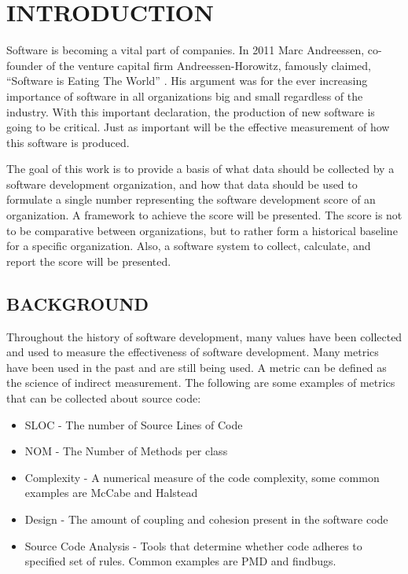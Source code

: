 \documentclass[SDSUThesis.tex]{subfiles}
\begin{document}
\newpage
{}
\setcounter{tocdepth}{2}

\section{INTRODUCTION}

    Software is becoming a vital part of companies. In 2011 Marc Andreessen, 
    co-founder of the venture capital firm Andreessen-Horowitz,
    famously claimed, ``Software is Eating The World'' \cite{Andreessen2001}. 
    His argument was for the ever increasing importance of software
    in all organizations big and small regardless of the industry.  With 
    this important declaration, the production of new software is
    going to be critical.  Just as important will be the effective 
    measurement of how this software is produced.  
    
    The goal of this work is to provide a basis of what data should 
    be collected by a software development organization, and how that data
    should be used to formulate a single number representing the 
    software development score of an organization. A framework to 
    achieve the score will be presented.  The  score
    is not to be comparative between organizations, but to 
    rather form a historical baseline for a specific organization.  Also, a software
    system to collect, calculate, and report the score will be presented.

\subsection{BACKGROUND}

    Throughout the history of software development, many values have been 
    collected and used to measure the effectiveness of software development. 
    Many metrics have been used in the past and are still being used.  
    A metric can be defined as the science of indirect measurement.
    The following are some examples of metrics that can be collected 
    about source code:
    \begin{itemize}
        \item SLOC - The number of Source Lines of Code 
        \item NOM - The Number of Methods per class
        \item Complexity - A numerical measure of the code complexity,
            some common examples are McCabe \cite{McCabe1976} and 
            Halstead \cite{Halstead1977}
        \item Design - The amount of coupling and cohesion present 
        in the software code
        \item Source Code Analysis - Tools that determine whether 
        code adheres to specified set of rules. Common 
        examples are PMD and findbugs.
    \end{itemize}
    
\end{document}
